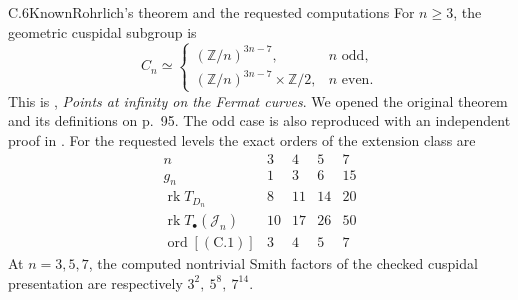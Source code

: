 \begin{statement}{C.6}{Known}{Rohrlich's theorem and the requested computations}
For \(n\ge3\), the geometric cuspidal subgroup is
\[
 C_n\simeq
 \begin{cases}
  (\mathbb Z/n)^{3n-7},&n\text{ odd},\\
  (\mathbb Z/n)^{3n-7}\times\mathbb Z/2,&n\text{ even}.
 \end{cases}
\]
This is \cite[Theorem 1, p.~101]{Rohrlich1977},
\emph{Points at infinity on the Fermat curves}. We opened the original
theorem and its definitions on p.~95. The odd case is also reproduced
with an independent proof in \cite[Theorem 1, p.~28-02]{Velu1979}.
For the requested levels the exact orders of the extension class
are
\[
\begin{array}{c|rrrr}
n&3&4&5&7\\ \hline
g_n&1&3&6&15\\
\operatorname{rk}T_{D_n}&8&11&14&20\\
\operatorname{rk}T_\bullet(\mathcal J_n)&10&17&26&50\\
\operatorname{ord}[(\mathrm{C.1})]&3&4&5&7
\end{array}
\]
At \(n=3,5,7\), the computed nontrivial Smith factors of the
checked cuspidal presentation are respectively
\(3^2,\ 5^8,\ 7^{14}\).
\end{statement}
